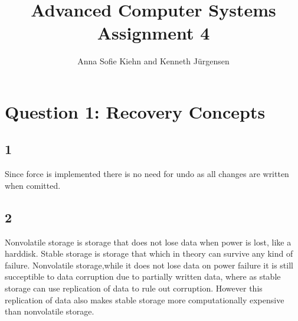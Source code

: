 \documentclass{article}
\theoremstyle{plain}
\theoremstyle{nonumberplain}
\begin{document}
\title{Advanced Computer Systems \\ Assignment 4}

\author{Anna Sofie Kiehn and Kenneth Jürgensen}

\maketitle

\section*{Question 1: Recovery Concepts}

\subsection*{1}
	Since force is implemented there is no need for undo as all changes are written when comitted. 

\subsection*{2}
	Nonvolatile storage is storage that does not lose data when power is lost, like a harddisk. Stable storage is storage that which in theory can survive any kind of failure. Nonvolatile storage,while it does not lose data on power failure it is still succeptible to data corruption due to partially written data, where as stable storage can use replication of data to rule out corruption. However this replication of data also makes stable storage more computationally expensive than nonvolatile storage.
\end{document}
